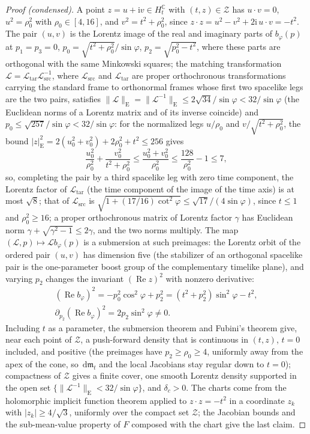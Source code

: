 \documentclass[aps,prl,reprint,longbibliography,raggedbottom]{revtex4-2}
\newcommand{\C}{\mathbb C}
\newcommand{\ii}{\mathrm i}
\newcommand{\dd}{\,\mathrm d}
\newcommand{\norm}[1]{\lVert #1\rVert}
\newcommand{\abs}[1]{\lvert #1\rvert}
\DeclareMathOperator{\Rea}{Re}
\begin{document}
\begin{proof}[Proof (condensed)]
A point $z=u+\ii v\in H_t^{\C}$ with $(t,z)\in\mathscr Z$ has
$u\cdot v=0$, $u^2=\rho_0^2$ with $\rho_0\in[4,16]$, and
$v^2=t^2+\rho_0^2$, since $z\cdot z=u^2-v^2+2\ii\,u\cdot v=-t^2$. The
pair $(u,v)$ is the Lorentz image of the
real and imaginary parts of $b_\varphi(p)$ at $p_1=p_3=0$,
$p_0=\sqrt{t^2+\rho_0^2}/\sin\varphi$, $p_2=\sqrt{p_0^2-t^2}$, where
these parts are orthogonal with the same Minkowski squares; the matching transformation
$\mathcal L=\mathcal L_{\mathrm{tar}}\mathcal L_{\mathrm{src}}^{-1}$,
where $\mathcal L_{\mathrm{src}}$ and $\mathcal L_{\mathrm{tar}}$ are
proper orthochronous transformations carrying the standard frame to
orthonormal frames whose first two spacelike legs are the two pairs,
satisfies
$\norm{\mathcal L}_{\mathrm E}=\norm{\mathcal L^{-1}}_{\mathrm E}\le2\sqrt{34}/\sin\varphi<32/\sin\varphi$
(the Euclidean norms of a Lorentz matrix and of its inverse coincide) and
$p_0\le\sqrt{257}/\sin\varphi<32/\sin\varphi$: for the
normalized legs $u/\rho_0$ and $v/\sqrt{t^2+\rho_0^2}$, the bound
$\abs z_{\mathrm E}^2=2(u_0^2+v_0^2)+2\rho_0^2+t^2\le256$ gives
\[
\frac{u_0^2}{\rho_0^2}+\frac{v_0^2}{t^2+\rho_0^2}
\le\frac{u_0^2+v_0^2}{\rho_0^2}\le\frac{128}{\rho_0^2}-1\le7,
\]
so, completing the pair by a third spacelike leg with zero time
component, the Lorentz factor of $\mathcal L_{\mathrm{tar}}$ (the time
component of the image of the time axis) is at most $\sqrt8$; that of
$\mathcal L_{\mathrm{src}}$ is
$\sqrt{1+(17/16)\cot^2\varphi}\le\sqrt{17}/(4\sin\varphi)$, since
$t\le1$ and $\rho_0^2\ge16$; a proper orthochronous matrix of Lorentz
factor $\gamma$ has Euclidean norm
$\gamma+\sqrt{\gamma^2-1}\le2\gamma$, and the two norms multiply. The
map $(\mathcal L,p)\mapsto\mathcal Lb_\varphi(p)$ is a submersion at such
preimages: the Lorentz orbit of the ordered pair $(u,v)$ has dimension
five (the stabilizer of an orthogonal spacelike pair is the
one-parameter boost group of the complementary timelike plane), and
varying $p_2$ changes the invariant $(\Rea z)^2$ with
nonzero derivative:
\[
\begin{gathered}
(\Rea b_\varphi)^2=-p_0^2\cos^2\varphi+p_2^2
=(t^2+p_2^2)\sin^2\varphi-t^2,\\
\partial_{p_2}(\Rea b_\varphi)^2=2p_2\sin^2\varphi\ne0 .
\end{gathered}
\]
Including $t$ as a parameter, the submersion
theorem and Fubini's theorem give, near each point of $\mathscr Z$, a
push-forward density that is continuous in $(t,z)$, $t=0$ included,
and positive (the preimages have $p_2\ge\rho_0\ge4$, uniformly
away from the apex of the cone, so $\dd\mathfrak m_t$ and the local
Jacobians stay regular down to $t=0$); compactness of $\mathscr Z$ gives a finite cover, one
smooth Lorentz density supported in the open set
$\{\norm{\mathcal L^{-1}}_{\mathrm E}<32/\sin\varphi\}$, and $\delta_c>0$.
The charts come from the holomorphic implicit function theorem applied
to $z\cdot z=-t^2$ in a coordinate $z_k$ with $\abs{z_k}\ge4/\sqrt3$,
uniformly over the compact set $\mathscr Z$; the Jacobian bounds and
the sub-mean-value property of $F$ composed with the chart give the
last claim.
\end{proof}
\end{document}
